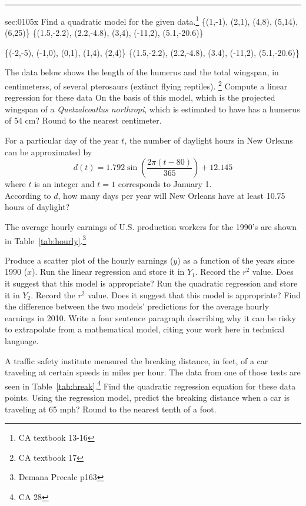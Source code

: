 \renewcommand{\columnseprule}{1.5pt}
\begin{multicols*}{2}
\rule[0.5\baselineskip]{0.4\textwidth}{1pt}
\noindent%
\ExSection\label{sec:0105x}
\begin{exercises}{sec:0105x}
\prob[0105Quad1] Find a quadratic model for the given data.\footnote{CA textbook 13-16}
\subprob \{(1,-1), (2,1), (4,8), (5,14), (6,25)\}
\subprob \{(1.5,-2.2), (2.2,-4.8), (3,4), (-11,2), (5.1,-20.6)\}

\prob[0105Quad2]
\subprob \{(-2,-5), (-1,0), (0,1), (1,4), (2,4)\}
\subprob \{(1.5,-2.2), (2.2,-4.8), (3.4), (-11,2), (5.1,-20.6)\}

\prob[0105Arch] The data below shows the length of the humerus and the total wingspan, in
centimeterss, of several pterosaurs (extinct flying reptiles). \footnote{CA textbook 17}
\subprob Compute a linear regression for these data
\subprob On the basis of this model, which is the projected wingspan of a 
\textit{Quetzalcoatlus northropi}, which is estimated to have has a humerus of 54 cm?  
Round to the nearest centimeter.



\prob[0105ModelDay] For a particular day of the year $t$, the number of 
daylight hours in New Orleans can be approximated by 
$$
d(t)=1.792\sin\left(\dfrac{2\pi(t-80)}{365}\right) + 12.145
$$
where $t$ is an integer and $t=1$ corresponds to January 1.\\ According to $d$, 
how many days per year will New Orleans have at least 10.75 hours of daylight?



\prob[0105Hourly] The average hourly earnings of U.S. production
workers for the 1990's are shown in Table~\ref{tab:hourly}.\footnote{Demana Precalc p163}


\subprob Produce a scatter plot of the hourly earnings ($y$) as a function
of the years since 1990 ($x$).
\subprob Run the linear regression and store it in $Y_1$.
\subprob Record the $r^2$ value.  Does it suggest that this model is appropriate?
\subprob Run the quadratic regression and store it in $Y_2$.
\subprob Record the $r^2$ value.  Does it suggest that this model is appropriate?
\subprob Find the difference between the two models' predictions for the average hourly earnings in 2010.
\subprob Write a four sentence paragraph describing why it can be risky to extrapolate from a mathematical
model, citing your work here in technical language.


\prob[0105traffic]
A traffic safety institute measured the breaking
distance, in feet, of a car traveling at certain speeds in miles per hour.
The data from one of those tests are seen in Table~\ref{tab:break}.\footnote{CA 28}
\subprob Find the quadratic regression equation for these data points.
\subprob Using the regression model, predict the breaking distance
when a car is traveling at 65 mph?  Round to the nearest tenth
of a foot.



\end{exercises}
\end{multicols*}
